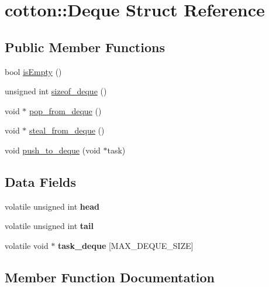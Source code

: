 \hypertarget{structcotton_1_1Deque}{}\section{cotton\+:\+:Deque Struct Reference}
\label{structcotton_1_1Deque}
\subsection*{Public Member Functions}
\begin{DoxyCompactItemize}
\item 
bool \mbox{\hyperlink{structcotton_1_1Deque_aa9786768e53c18c03e6e641e06e075e6}{is\+Empty}} ()
\item 
unsigned int \mbox{\hyperlink{structcotton_1_1Deque_af98d02aa97ac2dcaac8c7894cb9cb855}{sizeof\+\_\+deque}} ()
\item 
void $\ast$ \mbox{\hyperlink{structcotton_1_1Deque_a206682dc43f6b981adcf3c10c6696f1b}{pop\+\_\+from\+\_\+deque}} ()
\item 
void $\ast$ \mbox{\hyperlink{structcotton_1_1Deque_a33215b0b811484e2af94f2db16a5c15c}{steal\+\_\+from\+\_\+deque}} ()
\item 
void \mbox{\hyperlink{structcotton_1_1Deque_a482281bb7b1afec18e0f324156c2ad27}{push\+\_\+to\+\_\+deque}} (void $\ast$task)
\end{DoxyCompactItemize}
\subsection*{Data Fields}
\begin{DoxyCompactItemize}
\item 
\mbox{\label{structcotton_1_1Deque_af6b3bcb9724c06b1d44c1b2991cf5527}} 
volatile unsigned int {\bfseries head}
\item 
\mbox{\label{structcotton_1_1Deque_a072396dbfabb1e2de55c15eb352462be}} 
volatile unsigned int {\bfseries tail}
\item 
\mbox{\label{structcotton_1_1Deque_af2d64df8094054fb069ef74c5842df60}} 
volatile void $\ast$ {\bfseries task\+\_\+deque} \mbox{[}M\+A\+X\+\_\+\+D\+E\+Q\+U\+E\+\_\+\+S\+I\+ZE\mbox{]}
\end{DoxyCompactItemize}


\subsection{Member Function Documentation}
\mbox{\label{structcotton_1_1Deque_aa9786768e53c18c03e6e641e06e075e6}} 
